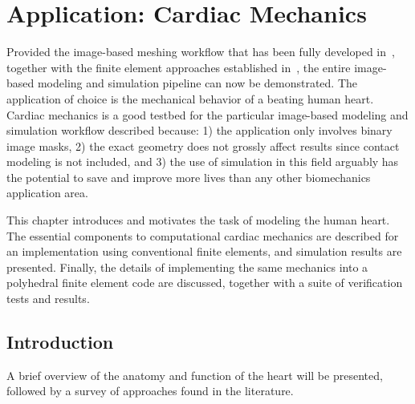 \chapter{Application: Cardiac Mechanics}
\label{chap:5}
%
Provided the image-based meshing workflow that has been fully developed in~, together with the finite element approaches established in~, the entire image-based modeling and simulation pipeline can now be demonstrated. The application of choice is the mechanical behavior of a beating human heart. Cardiac mechanics is a good testbed for the particular image-based modeling and simulation workflow described because: 1) the application only involves binary image masks, 2) the exact geometry does not grossly affect results since contact modeling is not included, and 3) the use of simulation in this field arguably has the potential to save and improve more lives than any other biomechanics application area.

This chapter introduces and motivates the task of modeling the human heart. The essential components to computational cardiac mechanics are described for an implementation using conventional finite elements, and simulation results are presented. Finally, the details of implementing the same mechanics into a polyhedral finite element code are discussed, together with a suite of verification tests and results.

\section{Introduction}

A brief overview of the anatomy and function of the heart will be presented, followed by a survey of approaches found in the literature.

